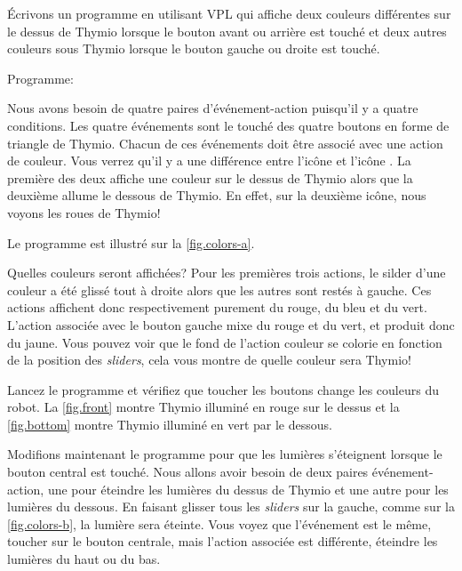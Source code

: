 

Écrivons un programme en utilisant VPL qui affiche deux couleurs différentes sur le dessus de Thymio lorsque le bouton avant ou arrière est touché et deux autres couleurs sous Thymio lorsque le bouton gauche ou droite est touché.

{\raggedleft \hfill Programme: }

Nous avons besoin de quatre paires d'événement-action puisqu'il y a quatre conditions. Les quatre événements sont le touché des quatre boutons en forme de triangle de Thymio. Chacun de ces événements doit être associé avec une action de couleur. Vous verrez qu'il y a une différence entre l'icône  et l'icône . La première des deux affiche une couleur sur le dessus de Thymio alors que la deuxième allume le dessous de Thymio. En effet, sur la deuxième icône, nous voyons les roues de Thymio!

Le programme est illustré sur la \cref{fig.colors-a}.

Quelles couleurs seront affichées? Pour les premières trois actions, le silder d'une couleur a été glissé tout à droite alors que les autres sont restés à gauche.
Ces actions affichent donc respectivement purement du rouge, du bleu et du vert.
L'action associée avec le bouton gauche mixe du rouge et du vert, et produit donc du jaune.
Vous pouvez voir que le fond de l'action couleur se colorie en fonction de la position des \textit{sliders}, cela vous montre de quelle couleur sera Thymio!

Lancez le programme et vérifiez que toucher les boutons change les couleurs du robot.
La \cref{fig.front} montre Thymio illuminé en rouge sur le dessus et la \cref{fig.bottom} montre Thymio illuminé en vert par le dessous.



Modifions maintenant le programme pour que les lumières s'éteignent lorsque le bouton central est touché. Nous allons avoir besoin de deux paires événement-action, une pour éteindre les lumières du dessus de Thymio et une autre pour les lumières du dessous. En faisant glisser tous les \textit{sliders} sur la gauche, comme sur la \cref{fig.colors-b}, la lumière sera éteinte.
Vous voyez que l'événement est le même, toucher sur le bouton centrale, mais l'action associée est différente, éteindre les lumières du haut ou du bas.

